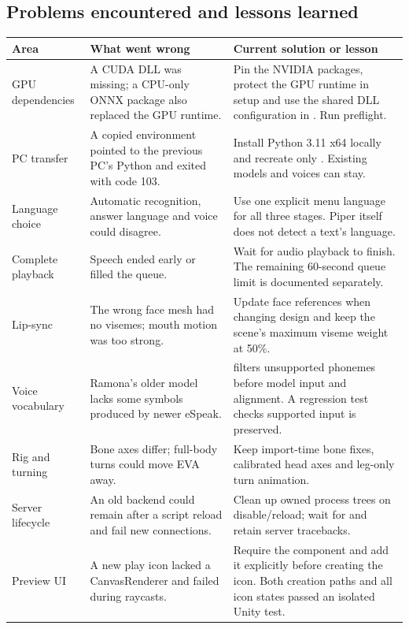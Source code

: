 \subsection{Problems encountered and lessons learned}
{\footnotesize
\begin{longtable}{@{}P{27mm}P{51mm}P{61mm}@{}}
\toprule
Area & What went wrong & Current solution or lesson\\
\midrule
\endhead
GPU dependencies & A CUDA DLL was missing; a CPU-only ONNX package also replaced
the GPU runtime. & Pin the NVIDIA packages, protect the GPU runtime in setup and
use the shared DLL configuration in . Run preflight.\\
PC transfer & A copied environment pointed to the previous PC's Python and
exited with code 103. & Install Python 3.11 x64 locally and recreate only
. Existing models and voices can stay.\\
Language choice & Automatic recognition, answer language and voice could
disagree. & Use one explicit menu language for all three stages. Piper itself
does not detect a text's language.\\
Complete playback & Speech ended early or filled the queue. & Wait for audio
playback to finish. The remaining 60-second queue limit is documented separately.\\
Lip-sync & The wrong face mesh had no visemes; mouth motion was too strong.
& Update face references when changing design and keep the scene's maximum
viseme weight at 50\%.\\
Voice vocabulary & Ramona's older model lacks some symbols produced by newer
eSpeak. &  filters unsupported phonemes before model input
and alignment. A regression test checks supported input is preserved.\\
Rig and turning & Bone axes differ; full-body turns could move EVA away.
& Keep import-time bone fixes, calibrated head axes and leg-only turn animation.\\
Server lifecycle & An old backend could remain after a script reload and fail
new connections. & Clean up owned process trees on disable/reload; wait for
 and retain server tracebacks.\\
Preview UI & A new play icon lacked a CanvasRenderer and failed during raycasts.
& Require the component and add it explicitly before creating the icon.
Both creation paths and all icon states passed an isolated Unity test.\\
\bottomrule
\end{longtable}}

